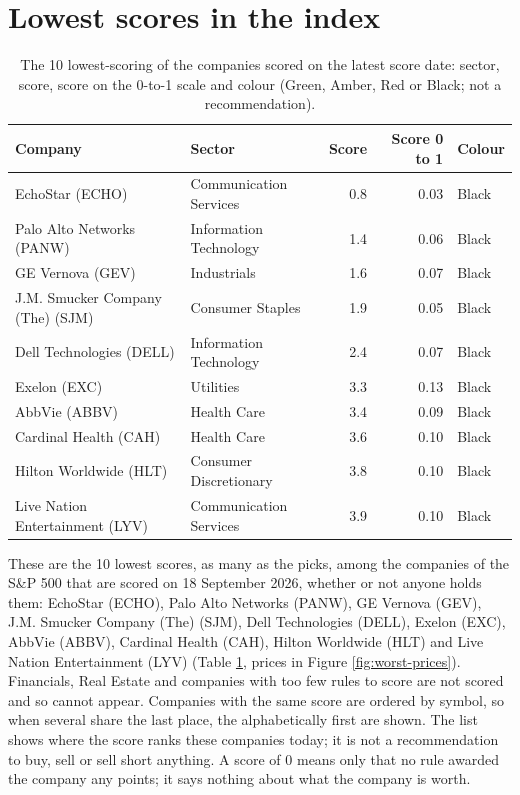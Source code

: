 \documentclass[11pt,a4paper]{article}
\begin{document}
\section{Lowest scores in the index}
\label{sec:worst}
\begin{table}[H]
\centering
\small
\caption{The 10 lowest-scoring of the companies scored on the latest score date: sector, score, score on the 0-to-1 scale and colour (Green, Amber, Red or Black; not a recommendation).}\label{tab:worst}
\begin{tabular}{p{4.4cm} p{3cm} r r p{3cm}}
\hline
Company & Sector & Score & Score 0 to 1 & Colour \\
\hline
EchoStar (ECHO) & Communication Services & 0.8 & 0.03 & \cellcolor[HTML]{BFBFBF}Black \\
Palo Alto Networks (PANW) & Information Technology & 1.4 & 0.06 & \cellcolor[HTML]{BFBFBF}Black \\
GE Vernova (GEV) & Industrials & 1.6 & 0.07 & \cellcolor[HTML]{BFBFBF}Black \\
J.M. Smucker Company (The) (SJM) & Consumer Staples & 1.9 & 0.05 & \cellcolor[HTML]{BFBFBF}Black \\
Dell Technologies (DELL) & Information Technology & 2.4 & 0.07 & \cellcolor[HTML]{BFBFBF}Black \\
Exelon (EXC) & Utilities & 3.3 & 0.13 & \cellcolor[HTML]{BFBFBF}Black \\
AbbVie (ABBV) & Health Care & 3.4 & 0.09 & \cellcolor[HTML]{BFBFBF}Black \\
Cardinal Health (CAH) & Health Care & 3.6 & 0.10 & \cellcolor[HTML]{BFBFBF}Black \\
Hilton Worldwide (HLT) & Consumer Discretionary & 3.8 & 0.10 & \cellcolor[HTML]{BFBFBF}Black \\
Live Nation Entertainment (LYV) & Communication Services & 3.9 & 0.10 & \cellcolor[HTML]{BFBFBF}Black \\
\hline
\end{tabular}
\end{table}
These are the 10 lowest scores, as many as the picks, among the companies of the S\&P 500 that are scored on 18 September 2026, whether or not anyone holds them: EchoStar (ECHO), Palo Alto Networks (PANW), GE Vernova (GEV), J.M. Smucker Company (The) (SJM), Dell Technologies (DELL), Exelon (EXC), AbbVie (ABBV), Cardinal Health (CAH), Hilton Worldwide (HLT) and Live Nation Entertainment (LYV) (Table \ref{tab:worst}, prices in Figure \ref{fig:worst-prices}). Financials, Real Estate and companies with too few rules to score are not scored and so cannot appear. Companies with the same score are ordered by symbol, so when several share the last place, the alphabetically first are shown. The list shows where the score ranks these companies today; it is not a recommendation to buy, sell or sell short anything. A score of 0 means only that no rule awarded the company any points; it says nothing about what the company is worth.
\end{document}
